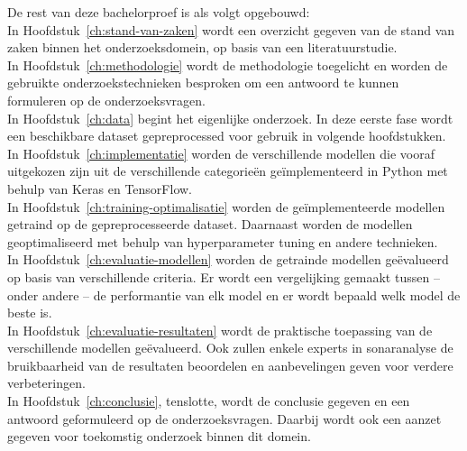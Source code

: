 De rest van deze bachelorproef is als volgt opgebouwd: \\

In Hoofdstuk~\ref{ch:stand-van-zaken} wordt een overzicht gegeven van de stand van zaken binnen het onderzoeksdomein, op basis van een literatuurstudie. \\

In Hoofdstuk~\ref{ch:methodologie} wordt de methodologie toegelicht en worden de gebruikte onderzoekstechnieken besproken om een antwoord te kunnen formuleren op de onderzoeksvragen. \\

In Hoofdstuk~\ref{ch:data} begint het eigenlijke onderzoek. In deze eerste fase wordt een beschikbare dataset gepreprocessed voor gebruik in volgende hoofdstukken. \\

In Hoofdstuk~\ref{ch:implementatie} worden de verschillende modellen die vooraf uitgekozen zijn uit de verschillende categorieën geïmplementeerd in Python met behulp van Keras en TensorFlow. \\

In Hoofdstuk~\ref{ch:training-optimalisatie} worden de geïmplementeerde modellen getraind op de gepreprocesseerde dataset. Daarnaast worden de modellen geoptimaliseerd met behulp van hyperparameter tuning en andere technieken. \\

In Hoofdstuk~\ref{ch:evaluatie-modellen} worden de getrainde modellen geëvalueerd op basis van verschillende criteria. Er wordt een vergelijking gemaakt tussen -- onder andere -- de performantie van elk model en er wordt bepaald welk model de beste is. \\

In Hoofdstuk~\ref{ch:evaluatie-resultaten} wordt de praktische toepassing van de verschillende modellen geëvalueerd. Ook zullen enkele experts in sonaranalyse de bruikbaarheid van de resultaten beoordelen en aanbevelingen geven voor verdere verbeteringen. \\

In Hoofdstuk~\ref{ch:conclusie}, tenslotte, wordt de conclusie gegeven en een antwoord geformuleerd op de onderzoeksvragen. Daarbij wordt ook een aanzet gegeven voor toekomstig onderzoek binnen dit domein.